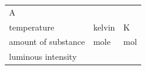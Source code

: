 {\begin{tabular}[t]{|l|l|l|}
        A%
     \tabularnewline\cline{1-1}\cline{2-2}\cline{3-3}
    
    
        temperature &
    
    
        kelvin &
    
    
        K%
     \tabularnewline\cline{1-1}\cline{2-2}\cline{3-3}
    
    
        amount of substance &
    
    
        mole &
    
    
        mol%
     \tabularnewline\cline{1-1}\cline{2-2}\cline{3-3}
    
    
        luminous intensity &
    

\end{tabular}}
